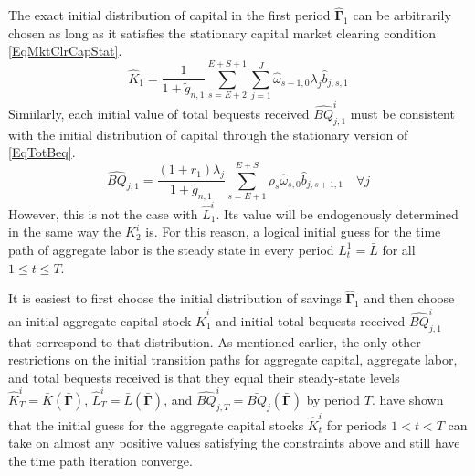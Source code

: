   The exact initial distribution of capital in the first period $\bm{\hat{\Gamma}}_1$ can be arbitrarily chosen as long as it satisfies the stationary capital market clearing condition \eqref{EqMktClrCapStat}.
  \begin{equation}\label{EqMktClrCapStat1}
    \hat{K}_1 = \frac{1}{1 + \tilde{g}_{n,1}}\sum_{s=E+2}^{E+S+1}\sum_{j=1}^{J}\hat{\omega}_{s-1,0}\lambda_j \hat{b}_{j,s,1}
  \end{equation}
  Simiilarly, each initial value of total bequests received $\hat{BQ}_{j,1}^i$ must be consistent with the initial distribution of capital through the stationary version of \eqref{EqTotBeq}.
  \begin{equation}\label{EqTotBeqStat1}
    \hat{BQ}_{j,1} = \frac{(1+r_1)\lambda_j}{1+\tilde{g}_{n,1}}\sum_{s=E+1}^{E+S}\rho_s\hat{\omega}_{s,0}\hat{b}_{j,s+1,1} \quad\forall j
  \end{equation}
  However, this is not the case with $\hat{L}_1^i$. Its value will be endogenously determined in the same way the $K_2^i$ is. For this reason, a logical initial guess for the time path of aggregate labor is the steady state in every period $L_t^1 = \bar{L}$ for all $1\leq t\leq T$.

  It is easiest to first choose the initial distribution of savings $\bm{\hat{\Gamma}}_1$ and then choose an initial aggregate capital stock $\hat{K}_1^i$ and initial total bequests received $\hat{BQ}_{j,1}^i$ that correspond to that distribution. As mentioned earlier, the only other restrictions on the initial transition paths for aggregate capital, aggregate labor, and total bequests received is that they equal their steady-state levels $\hat{K}_T^i = \bar{K}\left(\bm{\bar{\Gamma}}\right)$, $\hat{L}_T^i = \bar{L}\left(\bm{\bar{\Gamma}}\right)$, and $\hat{BQ}_{j,T}^i = \bar{BQ}_j\left(\bm{\bar{\Gamma}}\right)$ by period $T$. \citet{EvansPhillips:2014} have shown that the initial guess for the aggregate capital stocks $\hat{K}_t^i$ for periods $1<t<T$ can take on almost any positive values satisfying the constraints above and still have the time path iteration converge.

